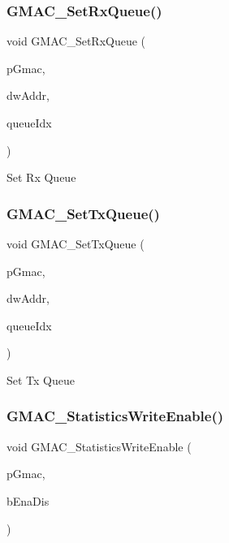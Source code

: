 \subsubsection{\texorpdfstring{GMAC\_SetRxQueue()}{GMAC\_SetRxQueue()}}
{\footnotesize\ttfamily void G\+M\+A\+C\+\_\+\+Set\+Rx\+Queue (\begin{DoxyParamCaption}\item[{\mbox{\hyperlink{structGmac}{Gmac}} $\ast$}]{p\+Gmac,  }\item[{uint32\+\_\+t}]{dw\+Addr,  }\item[{gmac\+Que\+List\+\_\+t}]{queue\+Idx }\end{DoxyParamCaption})}

Set Rx Queue \mbox{\label{group__gmac__defines_ga599028cc27124c0c292562833f31319c}} 
\subsubsection{\texorpdfstring{GMAC\_SetTxQueue()}{GMAC\_SetTxQueue()}}
{\footnotesize\ttfamily void G\+M\+A\+C\+\_\+\+Set\+Tx\+Queue (\begin{DoxyParamCaption}\item[{\mbox{\hyperlink{structGmac}{Gmac}} $\ast$}]{p\+Gmac,  }\item[{uint32\+\_\+t}]{dw\+Addr,  }\item[{gmac\+Que\+List\+\_\+t}]{queue\+Idx }\end{DoxyParamCaption})}

Set Tx Queue \mbox{\label{group__gmac__defines_gaf6fe272b7c94b53548c728c9b336cc5e}} 
\subsubsection{\texorpdfstring{GMAC\_StatisticsWriteEnable()}{GMAC\_StatisticsWriteEnable()}}
{\footnotesize\ttfamily void G\+M\+A\+C\+\_\+\+Statistics\+Write\+Enable (\begin{DoxyParamCaption}\item[{\mbox{\hyperlink{structGmac}{Gmac}} $\ast$}]{p\+Gmac,  }\item[{uint8\+\_\+t}]{b\+Ena\+Dis }\end{DoxyParamCaption})}

